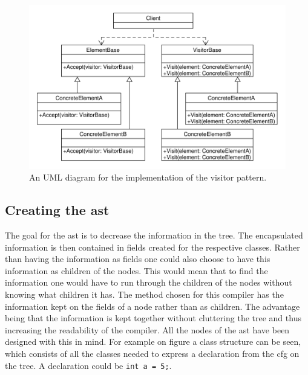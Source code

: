 \begin{figure}[!ht]
\centering
 \includegraphics[width=1\textwidth]{figures/ClassDiagrams/VisitorPattern.pdf} %
\caption{An UML diagram for the implementation of the visitor pattern.}\label{image:visitor}
\vspace{-15pt}
\end{figure}

\subsection*{Creating the \acrshort{ast}}\label{CreatingAst}

The goal for the \acrshort{ast} is to decrease the information in the tree.
The encapsulated information is then contained in fields created for the respective classes.
Rather than having the information as fields one could also choose to have this information as children of the nodes.
This would mean that to find the information one would have to run through the children of the nodes without knowing what children it has.
The method chosen for this compiler has the information kept on the fields of a node rather than as children.
The advantage being that the information is kept together without cluttering the tree and thus increasing the readability of the compiler.
All the nodes of the \acrshort{ast} have been designed with this in mind.
For example on figure  a class structure can be seen, which consists of all the classes needed to express a declaration from the \acrshort{cfg} on the tree.
A declaration could be \texttt{int a = 5;}.

